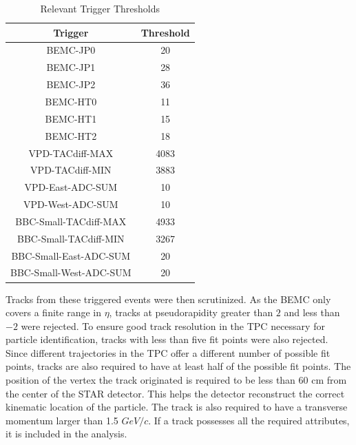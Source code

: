 \documentclass[letterpaper, abstract = on,listof=totoc, bibliography=totoc]{scrreprt}
\begin{document}
\begin{table}[h!]
\begin{center}
\begin{tabular}{|c|c|} \hline
Trigger & Threshold  \\
\hline
BEMC-JP0	& 20  \\
BEMC-JP1	& 28  \\
BEMC-JP2	& 36  \\
BEMC-HT0	& 11  \\
BEMC-HT1	& 15  \\
BEMC-HT2	& 18  \\
VPD-TACdiff-MAX	& 4083  \\
VPD-TACdiff-MIN	&  3883 \\
VPD-East-ADC-SUM & 10 \\
VPD-West-ADC-SUM & 10 \\
BBC-Small-TACdiff-MAX	& 4933  \\
BBC-Small-TACdiff-MIN	& 3267  \\
BBC-Small-East-ADC-SUM	& 20  \\
BBC-Small-West-ADC-SUM	& 20  \\
\hline
\end{tabular}
\caption{Relevant Trigger Thresholds}
\label{tab:thresh}
\end{center}
\end{table}



Tracks from these triggered events were then scrutinized. As the BEMC only covers a finite range in $\eta$, tracks at pseudorapidity greater than $2$ and less than $-2$ were rejected. To ensure good track resolution in the TPC necessary for particle identification, tracks with less than five fit points were also rejected. Since different trajectories in the TPC offer a different number of possible fit points, tracks are also required to have at least half of the possible fit points. The position of the vertex the track originated is required to be less than 60 cm from the center of the STAR detector. This helps the detector reconstruct the correct kinematic location of the particle. The track is also required to have a transverse momentum larger than 1.5 $GeV/c$. If a track possesses all the required attributes, it is included in the analysis.
\end{document}
